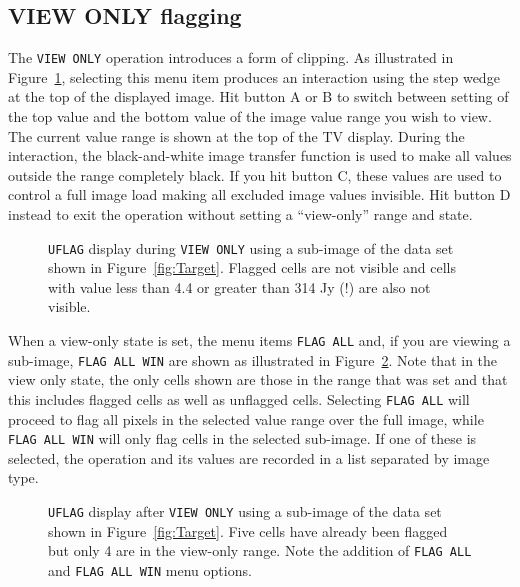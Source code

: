 \documentclass[twoside]{article}
\newcommand{\putfig}[1]{\texttt{[image: \#1]}}
\begin{document}
\subsection{VIEW ONLY flagging}

The {\tt VIEW ONLY} operation introduces a form of clipping.  As
illustrated in Figure~\ref{fig:Viewonly}, selecting this menu item
produces an interaction using the step wedge at the top of the
displayed image.  Hit button A or B to switch between setting of the
top value and the bottom value of the image value range you wish to
view.  The current value range is shown at the top of the TV display.
During the interaction, the black-and-white image transfer function is
used to make all values outside the range completely black.  If you
hit button C, these values are used to control a full image load
making all excluded image values invisible.  Hit button D instead to
exit the operation without setting a ``view-only'' range and state.

\begin{figure}
\begin{center}
\resizebox{6.5in}{!}{\putfig{Viewonly.eps}}
\caption{{\tt UFLAG} display during {\tt VIEW ONLY} using a sub-image
  of the data set shown in Figure~\ref{fig:Target}.  Flagged cells are
  not visible and cells with value less than 4.4 or greater than
  314 Jy (!) are also not visible.}
\label{fig:Viewonly}
\end{center}
\end{figure}

When a view-only state is set, the menu items {\tt FLAG ALL} and, if
you are viewing a sub-image, {\tt FLAG ALL WIN} are shown as
illustrated in Figure~\ref{fig:VOstate}.  Note that in the view only
state, the only cells shown are those in the range that was set and
that this includes flagged cells as well as unflagged cells.
Selecting {\tt FLAG ALL} will proceed to flag all pixels in the
selected value range over the full image, while {\tt FLAG ALL WIN}
will only flag cells in the selected sub-image.  If one of these is
selected, the operation and its values are recorded in a list
separated by image type.

\begin{figure}
\begin{center}
\resizebox{6.5in}{!}{\putfig{VOstate.eps}}
\caption{{\tt UFLAG} display after {\tt VIEW ONLY} using a sub-image
  of the data set shown in Figure~\ref{fig:Target}.  Five cells have
  already been flagged but only 4 are in the view-only range.  Note
  the addition of {\tt FLAG ALL} and {\tt FLAG ALL WIN} menu options.}
\label{fig:VOstate}
\end{center}
\end{figure}
\end{document}
